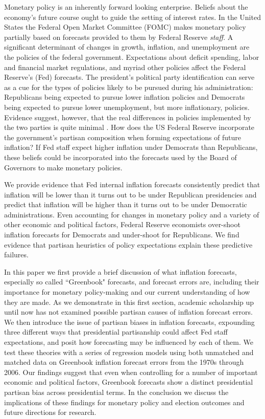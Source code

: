 \documentclass[a4paper]{article}\usepackage{graphicx, color}
\begin{document}
\vspace{0.3cm}

Monetary policy is an inherently forward looking enterprise. Beliefs about the economy's future course ought to guide the setting of interest rates. In the United States the Federal Open Market Committee (FOMC) makes monetary policy partially based on forecasts provided to them by Federal Reserve \emph{staff}. A significant determinant of changes in growth, inflation, and unemployment are the policies of the federal government. Expectations about deficit spending, labor and financial market regulations, and myriad other policies affect the Federal Reserve's (Fed) forecasts. The president's political party identification can serve as a cue for the types of policies likely to be pursued during his administration: Republicans being expected to pursue lower inflation policies and Democrats being expected to pursue lower unemployment, but more inflationary, policies. Evidence suggest, however, that the real differences in policies implemented by the two parties is quite minimal \citep{Bartels2008}. How does the US Federal Reserve incorporate the government's partisan composition when forming expectations of future inflation? If Fed staff expect higher inflation under Democrats than Republicans, these beliefs could be incorporated into the forecasts used by the Board of Governors to make monetary policies.

We provide evidence that Fed internal inflation forecasts consistently predict that inflation will be lower than it turns out to be under Republican presidencies and predict that inflation will be higher than it turns out to be under Democratic administrations. Even accounting for changes in monetary policy and a variety of other economic and political factors, Federal Reserve economists over-shoot inflation forecasts for Democrats and under-shoot for Republicans. We find evidence that partisan heuristics of policy expectations explain these predictive failures.

In this paper we first provide a brief discussion of what inflation forecasts, especially so called ``Greenbook" forecasts, and forecast errors are, including their importance for monetary policy-making and our current understanding of how they are made. As we demonstrate in this first section, academic scholarship up until now has not examined possible partisan causes of inflation forecast errors. We then introduce the issue of partisan biases in inflation forecasts, expounding three different ways that presidential partisanship could affect Fed staff expectations, and posit how forecasting may be influenced by each of them. We test these theories with a series of regression models using both unmatched and matched data on Greenbook inflation forecast errors from the 1970s through 2006. Our findings suggest that even when controlling for a number of important economic and political factors, Greenbook forecasts show a distinct presidential partisan bias across presidential terms. In the conclusion we discuss the implications of these findings for monetary policy and election outcomes and future directions for research.
\end{document}
